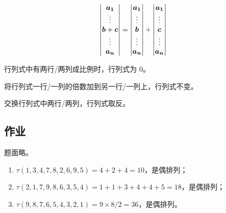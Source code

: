 \begin{property}
	$$
	\begin{vmatrix}
		\boldsymbol{a_1} \\
		\vdots \\
		\boldsymbol{b}+\boldsymbol{c} \\
		\vdots \\
		\boldsymbol{a_n}
	\end{vmatrix} =
	\begin{vmatrix}
		\boldsymbol{a_1} \\
		\vdots \\
		\boldsymbol{b} \\
		\vdots \\
		\boldsymbol{a_n}
	\end{vmatrix} +
	\begin{vmatrix}
		\boldsymbol{a_1} \\
		\vdots \\
		\boldsymbol{c} \\
		\vdots \\
		\boldsymbol{a_n}
	\end{vmatrix}
	$$
\end{property}

\begin{property}
	行列式中有两行/两列成比例时，行列式为 $0$。
\end{property}

\begin{property}
	将行列式一行/一列的倍数加到另一行/一列上，行列式不变。
\end{property}

\begin{property}
	交换行列式中两行/两列，行列式取反。
\end{property}

\subsection{作业}

\begin{problem}[课后习题 1]
	题面略。

	\begin{solution}
		\begin{enumerate}
			\item $\tau(1,3,4,7,8,2,6,9,5) = 4 + 2 + 4 = 10$，是偶排列；
			\item $\tau(2,1,7,9,8,6,3,5,4) = 1 + 1 + 3 + 4 + 4 + 5 = 18$，是偶排列；
			\item $\tau(9,8,7,6,5,4,3,2,1) = 9 \times 8 / 2 = 36$，是偶排列。
		\end{enumerate}
	\end{solution}
\end{problem}

